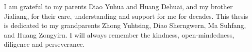\documentclass[
11pt, %
ngerman,
english, %
singlespacing, %
headsepline, %
]{MastersDoctoralThesis} %
\begin{document}
\begin{acknowledgements}
%
I am grateful to my parents Diao Yuhua and Huang Dehuai, and my brother Jialiang, for their care, 
understanding and support for me for decades. 
This thesis is dedicated to my grandparents Zhong Yuhtsing, Diao Sherngwern, Ma Suhfang, and Huang Zongyirn. 
I will always remember the kindness, open-mindedness, diligence and perseverance.
\end{acknowledgements}

{
\hypersetup{linkcolor=black}
\tableofcontents %
}

{
\hypersetup{linkcolor=black}
\listoffigures %
}

{
\hypersetup{linkcolor=black}
\listoftables %
}

\end{document}

